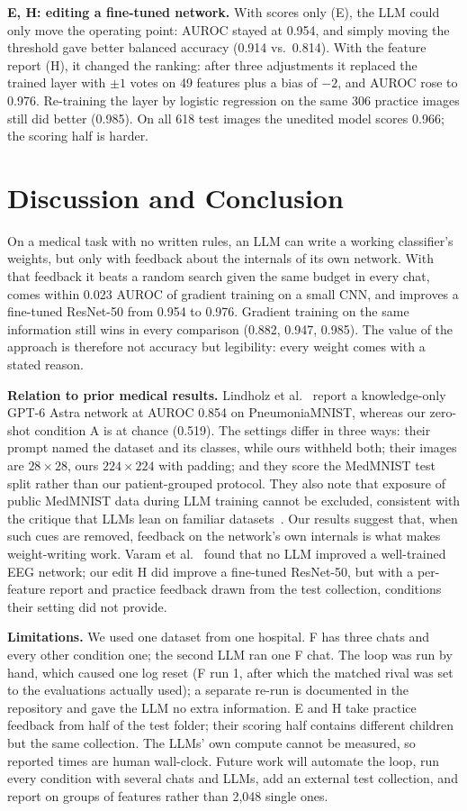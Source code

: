 \documentclass[runningheads]{llncs}
\newcommand{\Astra}{GPT-6 Astra}
\begin{document}
\noindent\textbf{E, H: editing a fine-tuned network.}
With scores only (E), the LLM could only move the operating point: AUROC stayed at 0.954, and simply moving the threshold gave better balanced accuracy (0.914 vs.\ 0.814).
With the feature report (H), it changed the ranking: after three adjustments it replaced the trained layer with $\pm1$ votes on 49 features plus a bias of $-2$, and AUROC rose to 0.976.
Re-training the layer by logistic regression on the same 306 practice images still did better (0.985).
On all 618 test images the unedited model scores 0.966; the scoring half is harder.

\section{Discussion and Conclusion}
On a medical task with no written rules, an LLM can write a working classifier's weights, but only with feedback about the internals of its own network.
With that feedback it beats a random search given the same budget in every chat, comes within 0.023 AUROC of gradient training on a small CNN, and improves a fine-tuned ResNet-50 from 0.954 to 0.976.
Gradient training on the same information still wins in every comparison (0.882, 0.947, 0.985).
The value of the approach is therefore not accuracy but legibility: every weight comes with a stated reason.

\noindent\textbf{Relation to prior medical results.}
Lindholz et al.~\cite{lindholz2026} report a knowledge-only \Astra{} network at AUROC 0.854 on PneumoniaMNIST, whereas our zero-shot condition A is at chance (0.519).
The settings differ in three ways: their prompt named the dataset and its classes, while ours withheld both; their images are $28\times28$, ours $224\times224$ with padding; and they score the MedMNIST test split rather than our patient-grouped protocol.
They also note that exposure of public MedMNIST data during LLM training cannot be excluded, consistent with the critique that LLMs lean on familiar datasets~\cite{ahmed2026}.
Our results suggest that, when such cues are removed, feedback on the network's own internals is what makes weight-writing work.
Varam et al.~\cite{varam2026} found that no LLM improved a well-trained EEG network; our edit H did improve a fine-tuned ResNet-50, but with a per-feature report and practice feedback drawn from the test collection, conditions their setting did not provide.

\noindent\textbf{Limitations.}
We used one dataset from one hospital.
F has three chats and every other condition one; the second LLM ran one F chat.
The loop was run by hand, which caused one log reset (F run 1, after which the matched rival was set to the evaluations actually used); a separate re-run is documented in the repository and gave the LLM no extra information.
E and H take practice feedback from half of the test folder; their scoring half contains different children but the same collection.
The LLMs' own compute cannot be measured, so reported times are human wall-clock.
Future work will automate the loop, run every condition with several chats and LLMs, add an external test collection, and report on groups of features rather than 2,048 single ones.
\end{document}
